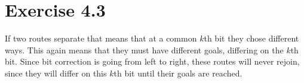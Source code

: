 \section*{Exercise 4.3}

If two routes separate that means that at a common $k$th bit they chose different ways.
This again means that they must have different goals, differing on the $k$th bit.
Since bit correction is going from left to right, these routes will never rejoin, since they will differ on this $k$th bit until their goals are reached.
